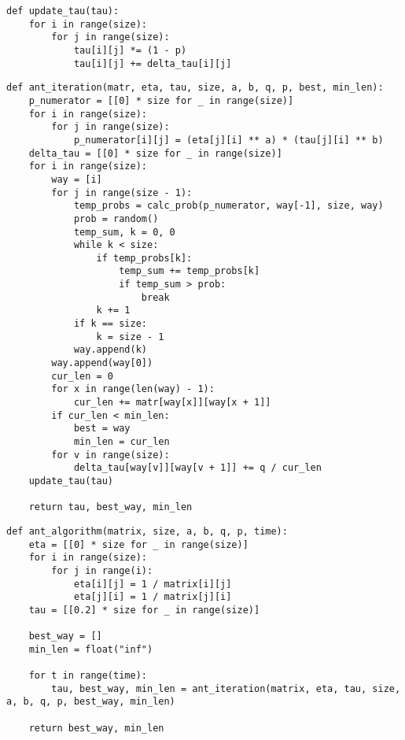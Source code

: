 \begin{lstlisting}[label=lst:ant2, caption=Обновление матрицы обоняния tau]
def update_tau(tau):
    for i in range(size):
        for j in range(size):
            tau[i][j] *= (1 - p)
            tau[i][j] += delta_tau[i][j]
\end{lstlisting}

\clearpage

\begin{lstlisting}[label=lst:ant3, caption=Итерация муравьиного алгоритма]
def ant_iteration(matr, eta, tau, size, a, b, q, p, best, min_len):
    p_numerator = [[0] * size for _ in range(size)]
    for i in range(size):
        for j in range(size):
            p_numerator[i][j] = (eta[j][i] ** a) * (tau[j][i] ** b)
    delta_tau = [[0] * size for _ in range(size)]
    for i in range(size):
        way = [i]
        for j in range(size - 1):
            temp_probs = calc_prob(p_numerator, way[-1], size, way)
            prob = random()
            temp_sum, k = 0, 0
            while k < size:
                if temp_probs[k]:
                    temp_sum += temp_probs[k]
                    if temp_sum > prob:
                        break
                k += 1
            if k == size:
                k = size - 1
            way.append(k)
        way.append(way[0])
        cur_len = 0
        for x in range(len(way) - 1):
            cur_len += matr[way[x]][way[x + 1]]
        if cur_len < min_len:
            best = way
            min_len = cur_len
        for v in range(size):
            delta_tau[way[v]][way[v + 1]] += q / cur_len
    update_tau(tau)

    return tau, best_way, min_len
\end{lstlisting}

\begin{lstlisting}[label=lst:ant4, caption=Реализация муравьиного алгоритма]
def ant_algorithm(matrix, size, a, b, q, p, time):
    eta = [[0] * size for _ in range(size)]
    for i in range(size):
        for j in range(i):
            eta[i][j] = 1 / matrix[i][j]
            eta[j][i] = 1 / matrix[j][i]
    tau = [[0.2] * size for _ in range(size)]

    best_way = []
    min_len = float("inf")

    for t in range(time):
        tau, best_way, min_len = ant_iteration(matrix, eta, tau, size, a, b, q, p, best_way, min_len)

    return best_way, min_len
\end{lstlisting}

